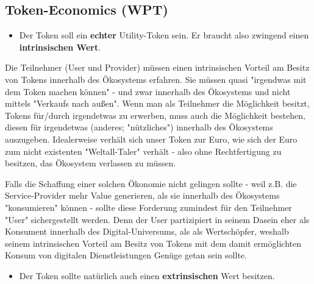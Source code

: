 
\subsection{Token-Economics (WPT)}
\label{sec:eco_wpt}


\vspace{0.3cm}

\begin{Praemisse}

\begin{itemize}
  \item Der Token soll ein \textbf{echter} Utility-Token sein. Er braucht also zwingend einen \textbf{intrinsischen Wert}.
\end{itemize}

\vspace{0.2cm}

Die Teilnehmer (User und Provider) müssen einen intrinsischen Vorteil am Besitz von Tokens innerhalb des Ökosystems erfahren. Sie müssen quasi "irgendwas mit dem Token machen können" - und zwar innerhalb des Ökosystems und nicht mittels "Verkaufs nach außen". Wenn man als Teilnehmer die Möglichkeit besitzt, Tokens für/durch irgendetwas zu erwerben, muss auch die Möglichkeit bestehen, diesen für irgendetwas (anderes; "nützliches") innerhalb des Ökosystems auszugeben. Idealerweise verhält sich unser Token zur Euro, wie sich der Euro zum nicht existenten "Weltall-Taler" verhält - also ohne Rechtfertigung zu besitzen, das Ökosystem verlassen zu müssen.

Falls die Schaffung einer solchen Ökonomie nicht gelingen sollte - weil z.B. die Service-Provider mehr Value generieren, als sie innerhalb des Ökosystems "konsumieren" können -  sollte diese Forderung zumindest für den Teilnehmer "User" sichergestellt werden. Denn der User partizipiert in seinem Dasein eher als Konsument innerhalb des Digital-Universums, als als Wertschöpfer, weshalb seinem intrinsischen Vorteil am Besitz von Tokens mit dem damit ermöglichten Konsum von digitalen Dienstleistungen Genüge getan sein sollte.

\vspace{0.3cm}

\begin{itemize}
  \item Der Token sollte natürlich auch einen \textbf{extrinsischen} Wert besitzen.
\end{itemize}


\end{Praemisse}
